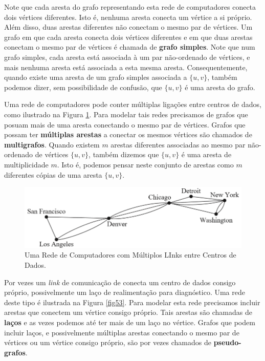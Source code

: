 Note que cada aresta do grafo representando esta rede de computadores conecta
dois vértices diferentes. Isto é, nenhuma aresta conecta um vértice a si
próprio. Além disso, duas arestas diferentes não conectam o mesmo par de
vértices. Um grafo em que cada aresta conecta dois vértices diferentes e em que
duas arestas conectam o mesmo par de vértices é chamada de \textbf{grafo
simples}. Note que num grafo simples, cada aresta está associada à um par
não-ordenado de vértices, e mais nenhuma aresta está associada a esta mesma
aresta. Consequentemente, quando existe uma aresta de um grafo simples associada
a $\{u,v\}$, também podemos dizer, sem possibilidade de confusão, que $\{u,v\}$
é uma aresta do grafo.

Uma rede de computadores pode conter múltiplas ligações entre centros de dados,
como ilustrado na Figura \ref{fig52}. Para modelar tais redes precisamos de
grafos que posuam mais de uma aresta conectando o mesmo par de vértices. Grafos
que possam ter \textbf{múltiplas arestas} a conectar os mesmos vértices são
chamados de \textbf{multigrafos}. Quando existem $m$ arestas diferentes
associadas ao mesmo par não-ordenado de vértices $\{u,v\}$, também dizemos que
$\{u,v\}$ é uma aresta de multiplicidade $m$. Isto é, podemos pensar neste
conjunto de arestas como $m$ diferentes cópias de uma aresta $\{u,v\}$.

\begin{figure}[H]
	\centering
	\includegraphics[scale=1]{chapter/imagens/52}
	\caption{Uma Rede de Computadores com Múltiplos LInks entre Centros de Dados.}
	\label{fig52}
\end{figure}

Por vezes um \textit{link} de comunicação de conecta um centro de dados consigo
próprio, possivelmente um laço de realimentação para diagnóstico. Uma rede deste
tipo é ilustrada na Figura \ref{fig53}. Para modelar esta rede precisamos
incluir arestas que conectem um vértice consigo próprio. Tais arestas são
chamadas de \textbf{laços} e as vezes podemos até ter mais de um laço no
vértice. Grafos que podem incluir laços, e possivelmente múltiplas arestas
conectando o mesmo par de vértices ou um vértice consigo próprio, são por vezes
chamados de \textbf{pseudo-grafos}.

